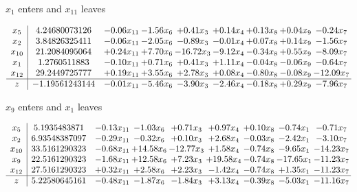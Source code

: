 \documentclass[9pt]{article}
\begin{document}
 $ x_{1} $ enters and $ x_{11} $ leaves 

 \[\begin{array}{c| c c@{\hskip 2pt} c@{\hskip 2pt} c@{\hskip 2pt} c@{\hskip 2pt} c@{\hskip 2pt} c@{\hskip 2pt} c@{\hskip 2pt} }
 x_{5}   &  4.24680073126 & -0.06 x_{11} & -1.56 x_{6} & +  0.41 x_{3} & +  0.14 x_{4} & +  0.13 x_{8} & +  0.04 x_{9} & -0.24 x_{7}\\
 x_{2}   &  3.84826325411 & -0.06 x_{11} & -2.05 x_{6} & -0.89 x_{3} & -0.01 x_{4} & +  0.07 x_{8} & +  0.14 x_{9} & -1.56 x_{7}\\
 x_{10}   &  21.2084095064 & +  0.24 x_{11} & +  7.70 x_{6} & -16.72 x_{3} & -9.12 x_{4} & -0.34 x_{8} & +  0.55 x_{9} & -8.09 x_{7}\\
 x_{1}   &  1.2760511883 & -0.10 x_{11} & +  0.71 x_{6} & +  0.41 x_{3} & +  1.11 x_{4} & -0.04 x_{8} & -0.06 x_{9} & -0.64 x_{7}\\
 x_{12}   &  29.2449725777 & +  0.19 x_{11} & +  3.55 x_{6} & +  2.78 x_{3} & +  0.08 x_{4} & -0.80 x_{8} & -0.08 x_{9} & -12.09 x_{7}\\
\hline
z    &  -1.19561243144 & -0.01 x_{11} & -5.46 x_{6} & -3.90 x_{3} & -2.46 x_{4} & -0.18 x_{8} & +  0.29 x_{9} & -7.96 x_{7}\\
\end{array}\]


 $ x_{9} $ enters and $ x_{1} $ leaves 

 \[\begin{array}{c| c c@{\hskip 2pt} c@{\hskip 2pt} c@{\hskip 2pt} c@{\hskip 2pt} c@{\hskip 2pt} c@{\hskip 2pt} c@{\hskip 2pt} }
 x_{5}   &  5.1935483871 & -0.13 x_{11} & -1.03 x_{6} & +  0.71 x_{3} & +  0.97 x_{4} & +  0.10 x_{8} & -0.74 x_{1} & -0.71 x_{7}\\
 x_{2}   &  6.93548387097 & -0.29 x_{11} & -0.32 x_{6} & +  0.10 x_{3} & +  2.68 x_{4} & -0.03 x_{8} & -2.42 x_{1} & -3.10 x_{7}\\
 x_{10}   &  33.5161290323 & -0.68 x_{11} & + 14.58 x_{6} & -12.77 x_{3} & +  1.58 x_{4} & -0.74 x_{8} & -9.65 x_{1} & -14.23 x_{7}\\
 x_{9}   &  22.5161290323 & -1.68 x_{11} & + 12.58 x_{6} & +  7.23 x_{3} & + 19.58 x_{4} & -0.74 x_{8} & -17.65 x_{1} & -11.23 x_{7}\\
 x_{12}   &  27.5161290323 & +  0.32 x_{11} & +  2.58 x_{6} & +  2.23 x_{3} & -1.42 x_{4} & -0.74 x_{8} & +  1.35 x_{1} & -11.23 x_{7}\\
\hline
z    &  5.22580645161 & -0.48 x_{11} & -1.87 x_{6} & -1.84 x_{3} & +  3.13 x_{4} & -0.39 x_{8} & -5.03 x_{1} & -11.16 x_{7}\\
\end{array}\]
\end{document}
